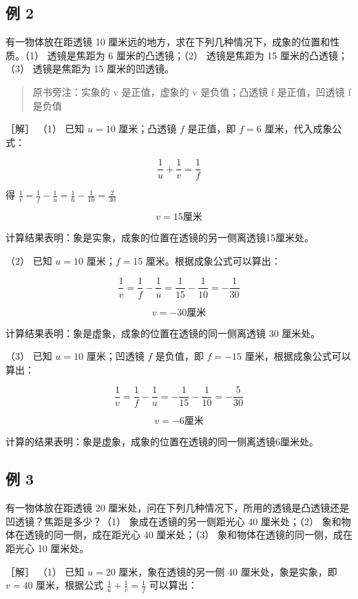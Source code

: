 \subsection{例 2}

有一物体放在距透镜 10
厘米远的地方，求在下列几种情况下，成象的位置和性质。（1） 透镜是焦距为 6
厘米的凸透镜；（2） 透镜是焦距为 15 厘米的凸透镜；（3） 透镜是焦距为 15
厘米的凹透镜。

\begin{quote}
原书旁注：实象的 v 是正值，虚象的 v 是负值；凸透镜 f 是正值，凹透镜 f
是负值
\end{quote}

［解］ （1） 已知 \(u = 10\) 厘米；凸透镜 \(f\) 是正值，即 \(f = 6\)
厘米，代入成象公式：

\[
\frac {1}{u} + \frac {1}{v} = \frac {1}{f}
\]

得
\(\frac{1}{v} = \frac{1}{f} -\frac{1}{u} = \frac{1}{6} -\frac{1}{10} = \frac{2}{30}\)

\[
v = 15 \text{厘米}
\]

计算结果表明：象是实象，成象的位置在透镜的另一侧离透镜15厘米处。

（2） 已知 \(u = 10\) 厘米；\(f = 15\) 厘米。根据成象公式可以算出：

\[
\frac {1}{v} = \frac {1}{f} - \frac {1}{u} = \frac {1}{15} - \frac {1}{10} = - \frac {1}{30}
\]

\[
v = - 30 \text{厘米}
\]

计算结果表明：象是虚象，成象的位置在透镜的同一侧离透镜 30 厘米处。

（3） 已知 \(u = 10\) 厘米；凹透镜 \(f\) 是负值，即 \(f = -15\)
厘米，根据成象公式可以算出：

\[
\frac {1}{v} = \frac {1}{f} - \frac {1}{u} = - \frac {1}{15} - \frac {1}{10} = - \frac {5}{30}
\]

\[
v = - 6 \text{厘米}
\]

计算的结果表明：象是虚象，成象的位置在透镜的同一侧离透镜6厘米处。

\subsection{例 3}

有一物体放在距透镜 20
厘米处，问在下列几种情况下，所用的透镜是凸透镜还是凹透镜？焦距是多少？（1）
象成在透镜的另一侧距光心 40 厘米处；（2）
象和物体在透镜的同一侧，成在距光心 40 厘米处；（3）
象和物体在透镜的同一侧，成在距光心 10 厘米处。

［解］ （1） 已知 \(u = 20\) 厘米，象在透镜的另一侧 40
厘米处，象是实象，即 \(v = 40\) 厘米，根据公式
\(\frac{1}{u} + \frac{1}{v} = \frac{1}{f}\) 可以算出：

